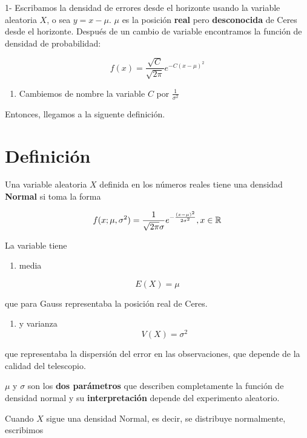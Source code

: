 \documentclass[
]{book}
\providecommand{\tightlist}{%
  \setlength{\itemsep}{0pt}\setlength{\parskip}{0pt}}
\begin{document}
1- Escribamos la densidad de errores desde el horizonte usando la variable aleatoria \(X\), o sea \(y=x-\mu\). \(\mu\) es la posición \textbf{real} pero \textbf{desconocida} de Ceres desde el horizonte. Después de un cambio de variable encontramos la función de densidad de probabilidad:

\[f(x)=\frac{\sqrt{C}}{\sqrt{2\pi}}e^{-C(x-\mu)^2}\]

\begin{enumerate}
\def\labelenumi{\arabic{enumi})}
\setcounter{enumi}{1}
\tightlist
\item
  Cambiemos de nombre la variable \(C\) por \(\frac{1}{\sigma^2}\)
\end{enumerate}

Entonces, llegamos a la siguente definición.

\hypertarget{definiciuxf3n}{%
\section{Definición}\label{definiciuxf3n}}

Una variable aleatoria \(X\) definida en los números reales tiene una densidad \textbf{Normal} si toma la forma

\[f(x; \mu, \sigma^2)=\frac{1}{\sqrt{2\pi}\sigma}e^{-\frac{(x-\mu)^2}{2\sigma^2}}, x \in {\Bbb R}\]

La variable tiene

\begin{enumerate}
\def\labelenumi{\arabic{enumi})}
\tightlist
\item
  media
\end{enumerate}

\[E(X) = \mu\]

que para Gauss representaba la posición real de Ceres.

\begin{enumerate}
\def\labelenumi{\arabic{enumi})}
\setcounter{enumi}{1}
\tightlist
\item
  y varianza
  \[V (X) = \sigma^2\]
\end{enumerate}

que representaba la dispersión del error en las observaciones, que depende de la calidad del telescopio.

\(\mu\) y \(\sigma\) son los \textbf{dos parámetros} que describen completamente la función de densidad normal y su \textbf{interpretación} depende del experimento aleatorio.

Cuando \(X\) sigue una densidad Normal, es decir, se distribuye normalmente, escribimos
\end{document}
